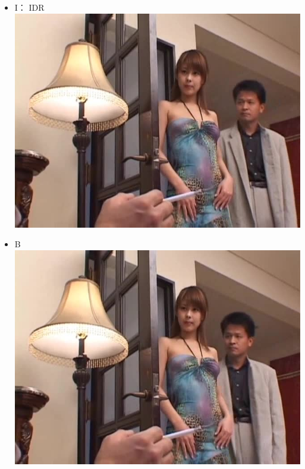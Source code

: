 \documentclass{beamer}
\begin{document}
\begin{frame}
\begin{itemize}
\item I： IDR\\
\includegraphics[scale=0.40]{fig/bfj1.jpg}
\end{itemize}
\end{frame}
\begin{frame}
\begin{itemize}
\item B\\
\includegraphics[scale=0.40]{fig/bfj2.jpg}
\end{itemize}
\end{frame}
\end{document}
